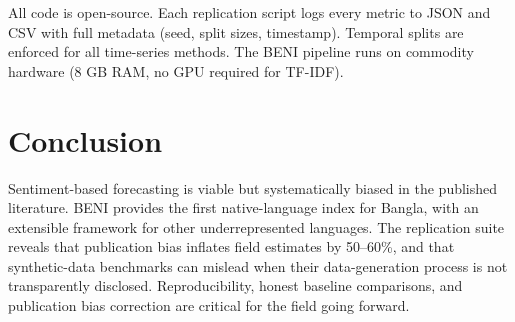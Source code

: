 \documentclass[11pt]{article}
\begin{document}
All code is open-source. Each replication script logs every metric to JSON and CSV with full metadata (seed, split sizes, timestamp). Temporal splits are enforced for all time-series methods. The BENI pipeline runs on commodity hardware (8 GB RAM, no GPU required for TF-IDF).

\section{Conclusion}

Sentiment-based forecasting is viable but systematically biased in the published literature. BENI provides the first native-language index for Bangla, with an extensible framework for other underrepresented languages. The replication suite reveals that publication bias inflates field estimates by 50--60\%, and that synthetic-data benchmarks can mislead when their data-generation process is not transparently disclosed. Reproducibility, honest baseline comparisons, and publication bias correction are critical for the field going forward.



\end{document}
